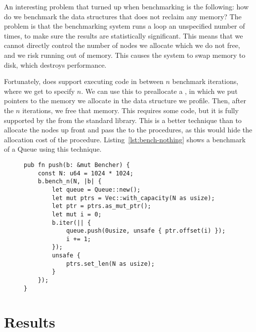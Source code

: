 \documentclass[b5paper]{report}
\begin{document}
An interesting problem that turned up when benchmarking is the following: how do
we benchmark the data structures that does not reclaim any memory? The problem
is that the benchmarking system runs a loop an unspecified number of times, to
make sure the results are statistically significant. This means that we cannot directly control the number of nodes
we allocate which we do not free, and we risk running out of memory. This causes
the system to swap memory to disk, which destroys performance.

Fortunately,  does support executing code in between $n$ benchmark
iterations, where we get to specify $n$. We can use this to preallocate a
, in which we put pointers to the memory we allocate in the data
structure we profile. Then, after the $n$ iterations, we free that memory.  This
requires some  code, but it is fully supported by the 
from the standard library. This is a better technique than to allocate the nodes
up front and pass the  to the procedures, as this would hide the
allocation cost of the procedure. Listing~\ref{lst:bench-nothing} shows a
benchmark of a Queue using this technique.

\begin{figure}[ht]
  \begin{lstlisting}[caption=Microbenchmark of a data structure without memory
  reclamation,label=lst:bench-nothing]
pub fn push(b: &mut Bencher) {
    const N: u64 = 1024 * 1024;
    b.bench_n(N, |b| {
        let queue = Queue::new();
        let mut ptrs = Vec::with_capacity(N as usize);
        let ptr = ptrs.as_mut_ptr();
        let mut i = 0;
        b.iter(|| {
            queue.push(0usize, unsafe { ptr.offset(i) });
            i += 1;
        });
        unsafe {
            ptrs.set_len(N as usize);
        }
    });
}
  \end{lstlisting}
\end{figure}




\chapter{Results}
\end{document}
